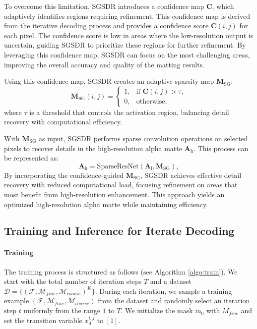 To overcome this limitation, SGSDR introduces a confidence map \( \mathbf{C} \), which adaptively identifies regions requiring refinement. This confidence map is derived from the iterative decoding process and provides a confidence score \( \mathbf{C}(i, j) \) for each pixel. The confidence score is low in areas where the low-resolution output is uncertain, guiding SGSDR to prioritize these regions for further refinement. By leveraging this confidence map, SGSDR can focus on the most challenging areas, improving the overall accuracy and quality of the matting results.

Using this confidence map, SGSDR creates an adaptive sparsity map \( \mathbf{M}_{\text{SG}} \):
\[
\mathbf{M}_{\text{SG}}(i, j) = 
\begin{cases} 
      1, & \text{if } \mathbf{C}(i, j) > \tau,\\
      0, & \text{otherwise},
   \end{cases}
\]
where \( \tau \) is a threshold that controls the activation region, balancing detail recovery with computational efficiency.

With \( \mathbf{M}_{\text{SG}} \) as input, SGSDR performs sparse convolution operations on selected pixels to recover details in the high-resolution alpha matte \( \mathbf{A}_{\text{h}} \). This process can be represented as:
\[
\mathbf{A}_{\text{h}} = \text{SparseResNet}(\mathbf{A}_{\text{l}}, \mathbf{M}_{\text{SG}}),
\]
By incorporating the confidence-guided \( \mathbf{M}_{\text{SG}} \), SGSDR achieves effective detail recovery with reduced computational load, focusing refinement on areas that most benefit from high-resolution enhancement. This approach yields an optimized high-resolution alpha matte while maintaining efficiency.


\begin{algorithm}[t]

\end{algorithm}

\subsection{Training and Inference for Iterate Decoding}
\label{sec:procedure}

\paragraph{Training}
The training process is structured as follows (see Algorithm \ref{algo:train}). We start with the total number of iteration steps \( T \) and a dataset \( \mathcal{D} = \{(\mathcal{F}, \mathcal{M}_{fine}, \mathcal{M}_{coarse})^K\} \). During each iteration, we sample a training example \( (\mathcal{F}, \mathcal{M}_{fine}, \mathcal{M}_{coarse}) \) from the dataset and randomly select an iteration step \( t \) uniformly from the range \( 1 \) to \( T \). We initialize the mask \( m_0 \) with \( M_{fine} \) and set the transition variable \( x_0^{i,j} \) to \([1]\).

